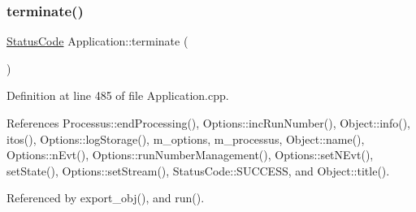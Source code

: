 \subsubsection{\texorpdfstring{terminate()}{terminate()}}
{\footnotesize\ttfamily \hyperlink{classStatusCode}{Status\+Code} Application\+::terminate (\begin{DoxyParamCaption}{ }\end{DoxyParamCaption})}



Definition at line 485 of file Application.\+cpp.



References Processus\+::end\+Processing(), Options\+::inc\+Run\+Number(), Object\+::info(), itos(), Options\+::log\+Storage(), m\+\_\+options, m\+\_\+processus, Object\+::name(), Options\+::n\+Evt(), Options\+::run\+Number\+Management(), Options\+::set\+N\+Evt(), set\+State(), Options\+::set\+Stream(), Status\+Code\+::\+S\+U\+C\+C\+E\+SS, and Object\+::title().



Referenced by export\+\_\+obj(), and run().


